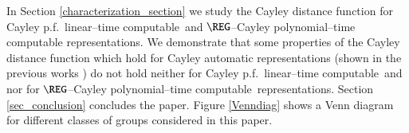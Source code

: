\documentclass[article,12pt]{elsarticle}
\newcommand\linearC{Cayley p.f.~linear--time computable}
\newcommand\polyC{Cayley polynomial--time computable}
\begin{document}
%
%
%
%
%
%
%
%
%
%
%
%
%
%
%
%
%
%
%


In Section \ref{characterization_section} we 
study the Cayley distance function 
for \linearC\ and $\REG$--Cayley 
polynomial--time computable representations. 
We demonstrate that some properties of 
the Cayley distance function 
which hold for Cayley automatic 
representations (shown in the previous works
\cite{BT_LATA18,eastwest19}) do not hold 
neither for \linearC\ and nor for 
$\REG$--\polyC\ representations.    
Section \ref{sec_conclusion} concludes the paper.
Figure \ref{Venndiag} shows a Venn diagram 
for different classes of groups considered in this paper.   
\end{document}
